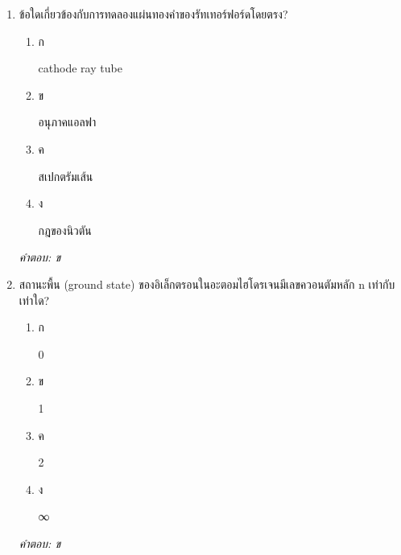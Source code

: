 \documentclass[12pt]{article}
\begin{document}
\begin{enumerate}[label=\arabic*., itemsep=0.5\baselineskip, topsep=0.5\baselineskip, leftmargin=*]
\item ข้อใดเกี่ยวข้องกับการทดลองแผ่นทองคำของรัทเทอร์ฟอร์ดโดยตรง?
\begin{enumerate}[label=\alph*)., itemsep=0.3\baselineskip, topsep=0.3\baselineskip]
\item ก\ 
\begin{minipage}[t]{0.9\linewidth}
\raggedright  cathode ray tube
\end{minipage}
\item ข\ 
\begin{minipage}[t]{0.9\linewidth}
\raggedright อนุภาคแอลฟา
\end{minipage}
\item ค\ 
\begin{minipage}[t]{0.9\linewidth}
\raggedright สเปกตรัมเส้น
\end{minipage}
\item ง\ 
\begin{minipage}[t]{0.9\linewidth}
\raggedright กฎของนิวตัน
\end{minipage}
\end{enumerate}
\vspace{-0.3\baselineskip}
\begin{small}
\textit{คำตอบ: ข}
\end{small}

\item สถานะพื้น (ground state) ของอิเล็กตรอนในอะตอมไฮโดรเจนมีเลขควอนตัมหลัก n เท่ากับเท่าใด?
\begin{enumerate}[label=\alph*)., itemsep=0.3\baselineskip, topsep=0.3\baselineskip]
\item ก\ 
\begin{minipage}[t]{0.9\linewidth}
\raggedright 0
\end{minipage}
\item ข\ 
\begin{minipage}[t]{0.9\linewidth}
\raggedright 1
\end{minipage}
\item ค\ 
\begin{minipage}[t]{0.9\linewidth}
\raggedright 2
\end{minipage}
\item ง\ 
\begin{minipage}[t]{0.9\linewidth}
\raggedright ∞
\end{minipage}
\end{enumerate}
\vspace{-0.3\baselineskip}
\begin{small}
\textit{คำตอบ: ข}
\end{small}


\end{enumerate}
\end{document}
